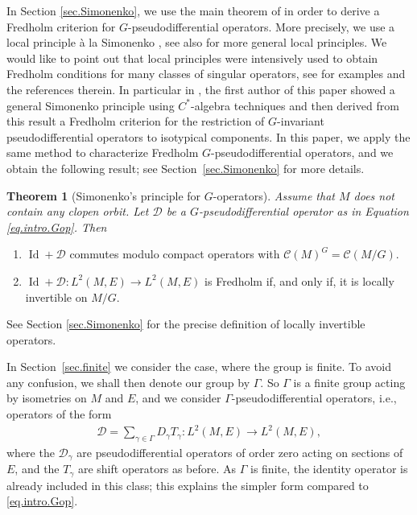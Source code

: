 \documentclass[11pt,a4paper]{amsart}
\newcommand{\maC}{\mathcal C}
\newcommand{\maD}{\mathcal D}
\newcommand\<{\langle}
\renewcommand\>{\rangle}
\newcommand{\oid}{\operatorname{Id}}
\theoremstyle{definition}
\newtheorem*{theorem*}{Theorem}
\begin{document}
\medskip
In Section \ref{sec.Simonenko}, we use the main theorem of \cite{Baldare.Simonenko} in order to derive a Fredholm criterion for $G$-pseudodifferential operators. More precisely, we use a local principle  \`a la Simonenko \cite{simonenko1965new}, see also \cite{allan,douglas} for more general local principles. We would like to point out that local principles were intensively 
used to obtain Fredholm conditions for many classes of singular operators, see for examples 
\cite{ABL98b,bottcher,Kisil_2012,PlSe2,NaSaSt4,Schulze.localPrinciple,semenyuta%
} and the references therein. In particular in \cite{Baldare.Simonenko}, the first author of this paper 
showed a general Simonenko principle using $C^*$-algebra techniques and then derived from this result a Fredholm criterion   for the restriction of $G$-invariant pseudodifferential operators to isotypical components. In this paper, we apply the same method to characterize Fredholm $G$-pseudodifferential operators, and we obtain the following result; see Section~\ref{sec.Simonenko} for more details.

\begin{theorem*}[Simonenko's principle for $G$-operators] 
\em Assume that $M$ does not contain any clopen orbit. 
Let $\maD$ be a $G$-pseudodifferential operator as in Equation \eqref{eq.intro.Gop}. Then
\begin{enumerate}\renewcommand\labelenumi{\rm(\alph{enumi})}
\item  $\oid + \maD$ commutes modulo compact operators with $\maC(M)^G=\maC(M/G)$.
\item $\oid + \maD: L^2(M,E) \to L^2(M,E)$ is Fredholm if, and only if, it  is locally invertible on $M/G$.
\end{enumerate}
\end{theorem*}

See Section \ref{sec.Simonenko} for the precise definition of locally invertible
operators. 
\medskip

In Section~\ref{sec.finite} we consider the case, where the group is finite. To avoid any confusion, 
we shall then  denote our group by $\Gamma$.  So  $\Gamma$ is a finite group acting by isometries on $M$ and $E$, and we consider $\Gamma$-pseudodifferential operators, i.e., operators of the form 
\begin{eqnarray}
\label{operatorsD}
\maD = \sum_{\gamma\in \Gamma}D_\gamma T_\gamma: L^2(M,E) \to L^2(M,E),
\end{eqnarray}
where the $\maD_\gamma$ are pseudodifferential operators of order zero acting on sections of $E$, and the $T_\gamma$ are shift operators as before. 
As $\Gamma$ is finite, the identity operator is already included in this class; this explains the simpler form compared to \eqref{eq.intro.Gop}.  
\end{document}
